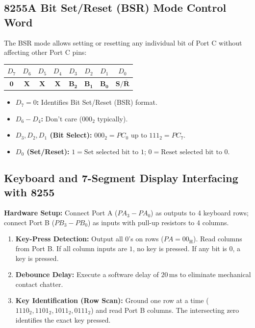 \documentclass[12pt,a4paper]{article}
\begin{document}
\subsection{8255A Bit Set/Reset (BSR) Mode Control Word}
\begin{tcolorbox}[formulabox, title={8255A Bit Set/Reset (BSR) Mode Control Word ($D_7 = 0$)}]
The BSR mode allows setting or resetting any individual bit of Port C without affecting other Port C pins:
\par\vspace{4pt}
\centering
\begin{tabular}{|c|c|c|c|c|c|c|c|}
\hline
\textbf{$D_7$} & \textbf{$D_6$} & \textbf{$D_5$} & \textbf{$D_4$} & \textbf{$D_3$} & \textbf{$D_2$} & \textbf{$D_1$} & \textbf{$D_0$} \\ \hline
$\mathbf{0}$ & $\mathbf{X}$ & $\mathbf{X}$ & $\mathbf{X}$ & $\mathbf{B_2}$ & $\mathbf{B_1}$ & $\mathbf{B_0}$ & $\mathbf{S/\overline{R}}$ \\ \hline
\end{tabular}
\par\vspace{4pt}\raggedright
\begin{itemize}[leftmargin=*, itemsep=2pt]
  \item \textbf{$D_7 = 0$:} Identifies Bit Set/Reset (BSR) format.
  \item \textbf{$D_6-D_4$:} Don't care ($000_2$ typically).
  \item \textbf{$D_3, D_2, D_1$ (Bit Select):} $000_2 = PC_0$ up to $111_2 = PC_7$.
  \item \textbf{$D_0$ (Set/Reset):} $1 = \text{Set selected bit to 1}$; $0 = \text{Reset selected bit to 0}$.
\end{itemize}
\end{tcolorbox}

\subsection{Keyboard and 7-Segment Display Interfacing with 8255}
\begin{tcolorbox}[examplebox, title={Interfacing a 4x4 Matrix Keyboard to 8255}]
\textbf{Hardware Setup:} Connect Port A ($PA_3-PA_0$) as outputs to 4 keyboard rows; connect Port B ($PB_3-PB_0$) as inputs with pull-up resistors to 4 columns.
\begin{enumerate}[leftmargin=*, itemsep=2pt]
  \item \textbf{Key-Press Detection:} Output all $0$'s on rows ($PA = 00_{\mathrm{H}}$). Read columns from Port B. If all column inputs are $1$, no key is pressed. If any bit is $0$, a key is pressed.
  \item \textbf{Debounce Delay:} Execute a software delay of $20\,\mathrm{ms}$ to eliminate mechanical contact chatter.
  \item \textbf{Key Identification (Row Scan):} Ground one row at a time ($1110_2, 1101_2, 1011_2, 0111_2$) and read Port B columns. The intersecting zero identifies the exact key pressed.
\end{enumerate}
\end{tcolorbox}
\end{document}
